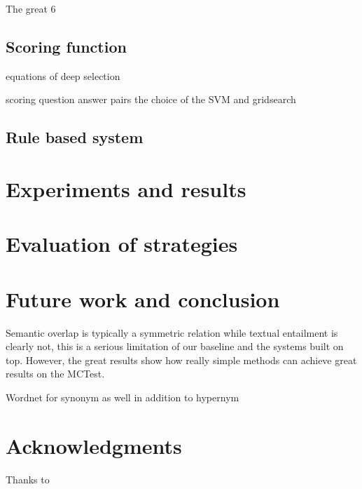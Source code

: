 \documentclass[11pt]{article}
\begin{document}
The great 6

\subsection{Scoring function}
equations of deep selection

scoring question answer pairs
the choice of the SVM and gridsearch
\label{sec:bigmix}

\subsection{Rule based system}
\label{sec:rulebased}

\section{Experiments and results}

\section{Evaluation of strategies}

\section{Future work and conclusion}

Semantic overlap is typically a symmetric relation while textual entailment is clearly not, this is a serious limitation of our baseline and the systems built on top. However, the great results show how really simple methods can achieve great results on the MCTest.

Wordnet for synonym as well in addition to hypernym

\section*{Acknowledgments}
Thanks to



\end{document}
